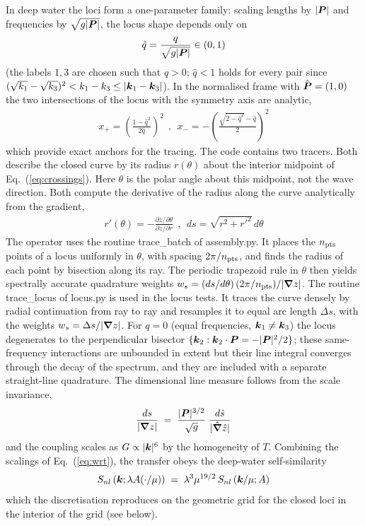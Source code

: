 \documentclass[12pt]{article}
\newcommand{\beq}  { \begin{eqnarray} }
\newcommand{\eeq}  { \end{eqnarray}}
\newcommand{\eq }  [1]{Eq.~(\ref{#1})}  %
\renewcommand{\v}[1]{{\mbox{\boldmath$ #1 $}}}  %
\newcommand{\p}{{\partial}}
\newcommand{\vn}{{\v \nabla}}
\newcommand{\lk}{\left(}
\newcommand{\rk}{\right)}
\begin{document}
In deep water the loci form a one-parameter family: scaling lengths by
$|\v P|$ and frequencies by $\sqrt{g |\v P|}$, the locus shape depends only on
\beq
 \hat q = \frac{q}{\sqrt{g |\v P|}} \in (0,1)
\eeq
(the labels $1,3$ are chosen such that $q>0$; $\hat q < 1$ holds for every
pair since $(\sqrt{k_1}-\sqrt{k_3})^2 < k_1 - k_3 \le |\v k_1 - \v k_3|$).
In the normalised frame with $\hat{\v P} = (1,0)$ the two intersections of
the locus with the symmetry axis are analytic,
\beq \label{eq:crossings}
 x_+ = \lk \frac{1-\hat q^2}{2 \hat q} \rk^2
 ~~,~~
 x_- = - \lk \frac{\sqrt{2-\hat q^2} - \hat q}{2} \rk^2
\eeq
which provide exact anchors for the tracing.
The code contains two tracers. Both describe the closed curve by its radius
$r(\theta)$ about the interior midpoint of \eq{eq:crossings}. Here $\theta$
is the polar angle about this midpoint, not the wave direction.
Both compute the derivative of the radius along the curve analytically from
the gradient,
\beq
 r'(\theta) = - \frac{\p z / \p \theta}{\p z / \p r}
 ~~,~~ ds = \sqrt{r^2 + r'^2}\, d\theta
\eeq
The operator uses the routine trace\_batch of assembly.py.
It places the $n_{\rm pts}$ points of a locus uniformly in $\theta$, with
spacing $2\pi/n_{\rm pts}$, and finds the radius of each point by bisection
along its ray.
The periodic trapezoid rule in $\theta$ then yields spectrally accurate
quadrature weights $w_s = (ds/d\theta)\,(2\pi/n_{\rm pts}) / |\vn z|$.
The routine trace\_locus of locus.py is used in the locus tests.
It traces the curve densely by radial continuation from ray to ray and
resamples it to equal arc length $\Delta s$, with the weights
$w_s = \Delta s / |\vn z|$.
For $q = 0$ (equal frequencies, $\v k_1 \ne \v k_3$) the locus degenerates to
the perpendicular bisector $\{ \v k_2 : \v k_2 \cdot \v P = -|\v P|^2/2 \}$;
these same-frequency interactions are unbounded in extent but their line
integral converges through the decay of the spectrum, and they are included
with a separate straight-line quadrature.
The dimensional line measure follows from the scale invariance,
\beq \label{eq:measure}
 \frac{ds}{|\vn z|} \;=\; \frac{|\v P|^{3/2}}{\sqrt{g}}\;
 \frac{d\hat s}{|\hat\vn \hat z|}
\eeq
and the coupling scales as $G \propto |\v k|^6$ by the homogeneity of $T$.
Combining the scalings of \eq{eq:wrt}, the transfer obeys the deep-water
self-similarity
\beq \label{eq:selfsim}
 S_{nl}\lk \v k; \lambda A(\cdot/\mu) \rk \;=\;
 \lambda^3 \mu^{19/2}\, S_{nl}\lk \v k/\mu;  A \rk
\eeq
which the discretisation reproduces on the geometric grid for the closed
loci in the interior of the grid (see below).
\end{document}
